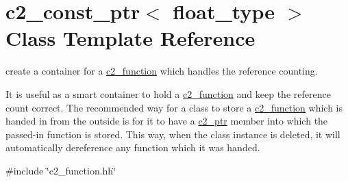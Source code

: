 \hypertarget{classc2__const__ptr}{}\section{c2\+\_\+const\+\_\+ptr$<$ float\+\_\+type $>$ Class Template Reference}
\label{classc2__const__ptr}


create a container for a \hyperlink{classc2__function}{c2\+\_\+function} which handles the reference counting.

It is useful as a smart container to hold a \hyperlink{classc2__function}{c2\+\_\+function} and keep the reference count correct. The recommended way for a class to store a \hyperlink{classc2__function}{c2\+\_\+function} which is handed in from the outside is for it to have a \hyperlink{classc2__ptr}{c2\+\_\+ptr} member into which the passed-\/in function is stored. This way, when the class instance is deleted, it will automatically dereference any function which it was handed.  




{\ttfamily \#include \char`\"{}c2\+\_\+function.\+hh\char`\"{}}



